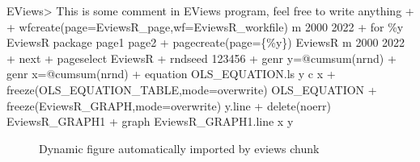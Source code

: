 \documentclass[
]{article}
\newenvironment{Shaded}{\begin{snugshade}}{\end{snugshade}}
\newcommand{\NormalTok}[1]{#1}
\begin{document}
\begin{Shaded}
\begin{Highlighting}[]
\NormalTok{EViews\textgreater{} \textquotesingle{}This is some comment in EViews program, feel free to write anything}
\NormalTok{+ }
\NormalTok{+ wfcreate(page=EviewsR\_page,wf=EviewsR\_workfile) m 2000 2022}
\NormalTok{+ for \%y EviewsR package page1 page2}
\NormalTok{+ pagecreate(page=\{\%y\}) EviewsR m 2000 2022}
\NormalTok{+ next}
\NormalTok{+ pageselect EviewsR}
\NormalTok{+ rndseed 123456}
\NormalTok{+ genr y=@cumsum(nrnd)}
\NormalTok{+ genr x=@cumsum(nrnd)}
\NormalTok{+ equation OLS\_EQUATION.ls y c x}
\NormalTok{+ freeze(OLS\_EQUATION\_TABLE,mode=overwrite) OLS\_EQUATION}
\NormalTok{+ freeze(EviewsR\_GRAPH,mode=overwrite) y.line}
\NormalTok{+ delete(noerr) EviewsR\_GRAPH1}
\NormalTok{+ graph EviewsR\_GRAPH1.line x y}
\end{Highlighting}
\end{Shaded}

\begin{figure}[h]

{\centering {}

}

\caption{Dynamic figure automatically imported by eviews chunk}\label{fig:EviewsR1}
\end{figure}
\end{document}
